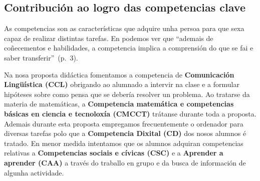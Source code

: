 \subsection{Contribución ao logro das competencias clave}\label{sec:competencias}
As competencias son as características que adquire unha persoa para que sexa capaz de realizar distintas tarefas. En  podemos ver que ``ademais de coñecementos e habilidades, a competencia implica a comprensión do que se fai e saber transferir''~(p.~3).

Na nosa proposta didáctica fomentamos a competencia de \textbf{Comunicación Lingüística (CCL)} obrigando ao alumnado a intervir na clase e a formular hipóteses sobre como pensa que se debería resolver un problema. Ao tratarse da materia de matemáticas, a \textbf{Competencia matemática e competencias básicas en ciencia e tecnoloxía (CMCCT)} trátanse durante toda a proposta. Ademais durante esta proposta empregamos frecuentemente o ordenador para diversas tarefas polo que a \textbf{Competencia Dixital (CD)} dos nosos alumnos é tratado. En menor medida intentamos que os alumnos adquiran competencias relativas a \textbf{Competencias sociais e cívicas (CSC)} e a \textbf{Aprender a aprender (CAA)} a través do traballo en grupo e da busca de información de algunha actividade.
